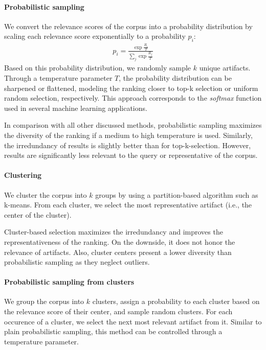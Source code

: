 \paragraph{Probabilistic sampling}
We convert the relevance scores of the corpus into a probability distribution by scaling each relevance score exponentially to a probability $p_i$:
\begin{align}
	p_i = \frac{\exp \frac{R_i}{T}}{\sum_j \exp \frac{R_j}{T}}
\end{align}
Based on this probability distribution, we randomly sample $k$ unique artifacts.
Through a temperature parameter $T$, the probability distribution can be sharpened or flattened, modeling the ranking closer to top-k selection or uniform random selection, respectively.
This approach corresponds to the \emph{softmax} function used in several machine learning applications.

In comparison with all other discussed methods, probabilistic sampling maximizes the diversity of the ranking if a medium to high temperature is used.
Similarly, the irredundancy of results is slightly better than for top-k-selection.
However, results are significantly less relevant to the query or representative of the corpus.

\paragraph{Clustering}
We cluster the corpus into $k$ groups by using a partition-based algorithm such as k-means.
From each cluster, we select the most representative artifact (i.e., the center of the cluster).

Cluster-based selection maximizes the irredundancy and improves the representativeness of the ranking.
On the downside, it does not honor the relevance of artifacts.
Also, cluster centers present a lower diversity than probabilistic sampling as they neglect outliers.

\paragraph{Probabilistic sampling from clusters}
We group the corpus into $k$ clusters, assign a probability to each cluster based on the relevance score of their center, and sample random clusters.
For each occurence of a cluster, we select the next most relevant artifact from it.
Similar to plain probabilistic sampling, this method can be controlled through a temperature parameter.

